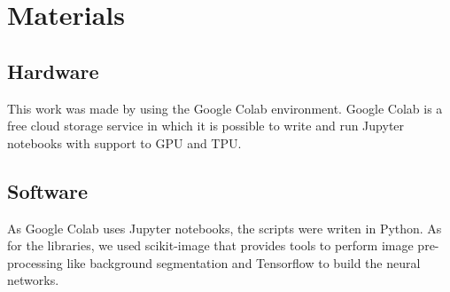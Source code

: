 \documentclass[../main.tex]{subfile}
\begin{document}
\section{Materials} \label{sec:materials}

    \subsection{Hardware} \label{subsec:hardware}
    This work was made by using the Google Colab environment. Google Colab is a free cloud storage service in which it is possible to write and run Jupyter notebooks with support to GPU and TPU.
    
    \subsection{Software} \label{subsec:software}
    As Google Colab uses Jupyter notebooks, the scripts were writen in Python. As for the libraries, we used scikit-image that provides tools to perform image pre-processing like background segmentation and Tensorflow to build the neural networks.
\end{document}
